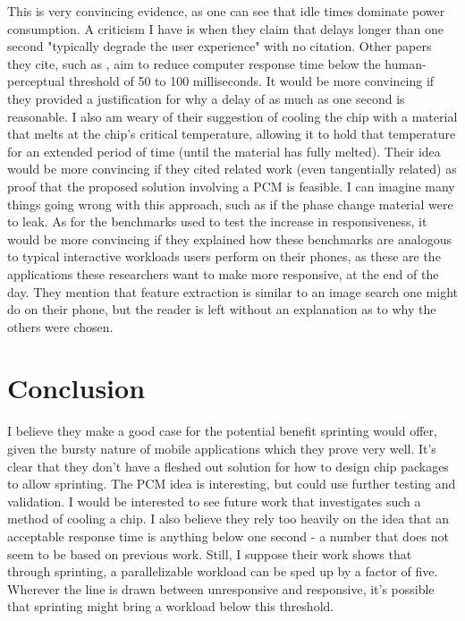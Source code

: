 \documentclass{article}
\begin{document}
This is very convincing evidence, as one can see that idle times dominate power
consumption. A criticism I have is when they claim that delays longer than one
second "typically degrade the user experience" with no citation. Other papers
they cite, such as \cite{45}, aim to reduce computer response time below the
human-perceptual threshold of 50 to 100 milliseconds. It would be more
convincing if they provided a justification for why a delay of as much as one
second is reasonable. I also am weary of their suggestion of cooling the chip
with a material that melts at the chip's critical temperature, allowing it to
hold that temperature for an extended period of time (until the material has
fully melted). Their idea would be more convincing if they cited related work
(even tangentially related) as proof that the proposed solution involving a PCM
is feasible. I can imagine many things going wrong with this approach, such as
if the phase change material were to leak. As for the benchmarks used to test
the increase in responsiveness, it would be more convincing if they explained
how these benchmarks are analogous to typical interactive workloads users
perform on their phones, as these are the applications these researchers want to
make more responsive, at the end of the day. They mention that feature
extraction is similar to an image search one might do on their phone, but the
reader is left without an explanation as to why the others were chosen.

\section*{Conclusion}
I believe they make a good case for the potential benefit sprinting would offer,
given the bursty nature of mobile applications which they prove very well. It's
clear that they don't have a fleshed out solution for how to design chip
packages to allow sprinting. The PCM idea is interesting, but could use further
testing and validation. I would be interested to see future work that
investigates such a method of cooling a chip. I also believe they rely too
heavily on the idea that an acceptable response time is anything below one
second - a number that does not seem to be based on previous work. Still, I
suppose their work shows that through sprinting, a parallelizable workload can
be sped up by a factor of five. Wherever the line is drawn between unresponsive and responsive, it's possible
that sprinting might bring a workload below this threshold.




\end{document}
